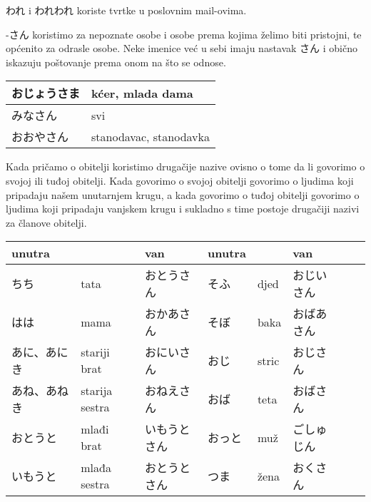 	\vspace{10pt}	
	
	われ i われわれ koriste tvrtke u poslovnim mail-ovima.
	
	
	\ten {}

	\vspace{10pt}

	-さん	koristimo za nepoznate osobe i osobe prema kojima želimo biti pristojni, te općenito za odrasle osobe. Neke imenice već u sebi imaju nastavak さん i obično iskazuju poštovanje prema onom na što se odnose.
	
	
	\vspace{10pt}	
	
	\begin{tabular}{|l|l|}
		\hline
		おじょうさま&kćer, mlada dama\\\hline
		みなさん&svi\\\hline
		おおやさん&stanodavac, stanodavka\\\hline

	\end{tabular}
	
	\vspace{10pt}
	
	Kada pričamo o obitelji koristimo drugačije nazive ovisno o tome da li govorimo o svojoj ili tuđoj obitelji. Kada govorimo o svojoj obitelji govorimo o ljudima koji pripadaju našem unutarnjem krugu, a kada govorimo o tuđoj obitelji govorimo o ljudima koji pripadaju vanjskem krugu i sukladno s time postoje drugačiji nazivi za članove obitelji.
	
	\vspace{10pt}	
	
	\begin{tabular}{|l|l|l||l|l|l|l|l|}
		\hline
		unutra& &van&unutra& &van\\\hline
		ちち&tata&おとうさん&そふ&djed&おじいさん\\\hline
		はは&mama&おかあさん&そぼ&baka&おばあさん\\\hline
		あに、あにき&stariji brat&おにいさん&おじ&stric&おじさん\\\hline
		あね、あねき&starija sestra&おねえさん&おば&teta&おばさん\\\hline
		おとうと&mlađi brat&いもうとさん&おっと&muž&ごしゅじん\\\hline
		いもうと&mlađa sestra&おとうとさん&つま&žena&おくさん\\\hline
	\end{tabular}
	
